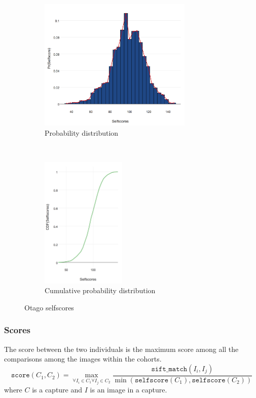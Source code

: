 \begin{figure}[htb]
    \begin{subfigure}[t]{0.6\textwidth}
        \centering
        \includegraphics[height=2.5in]{dataset/otago/selfscores}
        \caption{Probability distribution}
    \end{subfigure}%
    ~
    \begin{subfigure}[t]{0.35\textwidth}
        \centering
        \includegraphics[height=2.5in]{dataset/otago/cdf_selfscores}
        \caption{Cumulative probability distribution}
    \end{subfigure}
    \caption{Otago selfscores}
\end{figure}

\subsubsection{Scores}

The score between the two individuals is the maximum score among all the
comparisons among the images within the cohorts.
$$\texttt{score}(C_1, C_2) = \max_{\forall I_i \in C_1 \forall I_j \in C_2}
    \frac{\texttt{sift\_match}(I_i, I_j)}{\min(\texttt{selfscore}(C_1),
        \texttt{selfscore}(C_2))}$$
where $C$ is a capture and $I$ is an image in a capture.

